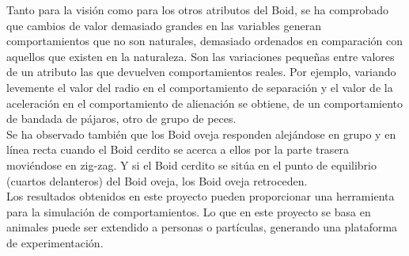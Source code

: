 Tanto para la visión como para los otros atributos del Boid, se ha comprobado que cambios de valor demasiado grandes en las variables 
generan comportamientos que no son naturales, demasiado ordenados en comparación con aquellos que existen en la naturaleza. Son las variaciones
pequeñas entre valores de un atributo las que devuelven comportamientos reales. Por ejemplo, variando levemente el valor del radio en el 
comportamiento de separación y el valor de la aceleración en el comportamiento de alienación se obtiene, de un comportamiento de bandada 
de pájaros, otro de grupo de peces. \\

Se ha observado también que los Boid oveja responden alejándose en grupo y en línea recta cuando el Boid cerdito se acerca a ellos
por la parte trasera moviéndose en zig-zag. Y si el Boid cerdito se sitúa en el punto de equilibrio (cuartos delanteros) del Boid oveja, 
los Boid oveja retroceden.\\

Los resultados obtenidos en este proyecto pueden proporcionar una herramienta para la simulación de comportamientos. Lo que en este
proyecto se basa en animales puede ser extendido a personas o partículas, generando una plataforma de experimentación.


